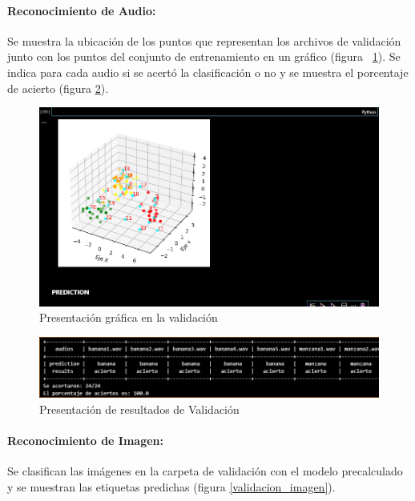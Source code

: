 \documentclass[a4paper, 12pt]{article}
\begin{document}
\paragraph{Reconocimiento de Audio:} Se muestra la ubicación de los puntos que representan los archivos de validación junto con los puntos del conjunto de entrenamiento en un gráfico (figura ~\ref{validacion_audio_agrupamiento}). Se indica para cada audio si se acertó la clasificación o no y se muestra el porcentaje de acierto (figura \ref{validacion_audio}).
\begin{figure}[htbp]
    \centering
    \includegraphics[width=\linewidth]{VALIDACION_AUDIO.PNG}
    \caption{Presentación gráfica en la validación}
    \label{validacion_audio_agrupamiento}
\end{figure}
\begin{figure}[htbp]
    \centering
    \includegraphics[width=\linewidth]{VALIDACION_AUDIO1.PNG}
    \caption{Presentación de resultados de Validación}
    \label{validacion_audio}
\end{figure}

\paragraph{Reconocimiento de Imagen:} Se clasifican las imágenes en la carpeta de validación con el modelo precalculado y se muestran las etiquetas predichas (figura \ref{validacion_imagen}).
\end{document}
